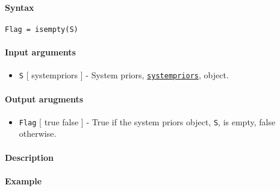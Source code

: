 


	\paragraph{Syntax}\label{syntax}

\begin{verbatim}
Flag = isempty(S)
\end{verbatim}

\paragraph{Input arguments}\label{input-arguments}

\begin{itemize}
\itemsep1pt\parskip0pt
\item
  \texttt{S} {[} systempriors {]} - System priors,
  \href{systempriors/Contents}{\texttt{systempriors}}, object.
\end{itemize}

\paragraph{Output arugments}\label{output-arugments}

\begin{itemize}
\itemsep1pt\parskip0pt
\item
  \texttt{Flag} {[} true \textbar{} false {]} - True if the system
  priors object, \texttt{S}, is empty, false otherwise.
\end{itemize}

\paragraph{Description}\label{description}

\paragraph{Example}\label{example}



